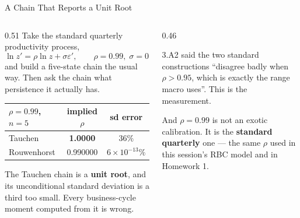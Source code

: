 \begin{frame}{A Chain That Reports a Unit Root}
\begin{columns}[T]
\begin{column}{0.51\textwidth}
\small
Take the standard quarterly productivity process,
\[
  \ln z'=\rho\ln z+\sigma\varepsilon', \qquad \rho=0.99,\;\sigma=0.007,
\]
and build a five-state chain the usual way. Then ask the chain what persistence it actually has.
\medskip
\begin{center}\footnotesize
\begin{tabularx}{\linewidth}{@{}>{\raggedright\arraybackslash}X c c@{}}
\toprule
$\rho=0.99$, $n=5$ & \textbf{implied $\rho$} & \textbf{sd error} \\
\midrule
Tauchen & \textbf{1.0000} & $36\%$ \\
Rouwenhorst & 0.990000 & $6\times10^{-13}\%$ \\
\bottomrule
\end{tabularx}
\end{center}
\medskip
The Tauchen chain is a \textbf{unit root}, and its unconditional standard deviation is a third too small. Every business-cycle moment computed from it is wrong.
\end{column}
\begin{column}{0.46\textwidth}
\begin{cautionbox}[title=\textbf{Session 3 owed you this}]\small
3.A2 said the two standard constructions ``disagree badly when $\rho>0.95$, which is exactly the range macro uses''. This is the measurement.
\end{cautionbox}
\medskip
\begin{takeawaybox}\footnotesize
And $\rho=0.99$ is not an exotic calibration. It is the \textbf{standard quarterly} one --- the same $\rho$ used in this session's RBC model and in Homework 1.
\end{takeawaybox}
\end{column}
\end{columns}
\end{frame}

